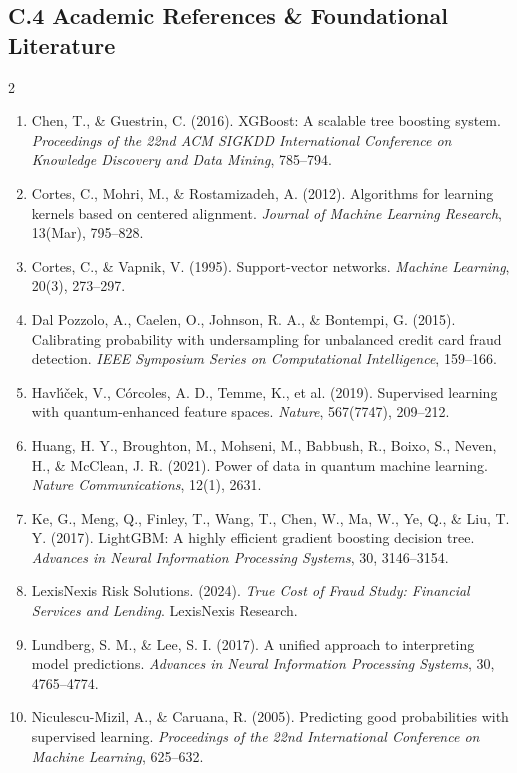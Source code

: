 \documentclass[10pt,a4paper]{article}
\begin{document}
\subsection*{C.4 Academic References \& Foundational Literature}
\begin{multicols}{2}
\begin{enumerate}[leftmargin=*,itemsep=0.2pt,topsep=0.5pt]
\tiny
\item Chen, T., \& Guestrin, C. (2016). XGBoost: A scalable tree boosting system. \textit{Proceedings of the 22nd ACM SIGKDD International Conference on Knowledge Discovery and Data Mining}, 785--794.
\item Cortes, C., Mohri, M., \& Rostamizadeh, A. (2012). Algorithms for learning kernels based on centered alignment. \textit{Journal of Machine Learning Research}, 13(Mar), 795--828.
\item Cortes, C., \& Vapnik, V. (1995). Support-vector networks. \textit{Machine Learning}, 20(3), 273--297.
\item Dal Pozzolo, A., Caelen, O., Johnson, R. A., \& Bontempi, G. (2015). Calibrating probability with undersampling for unbalanced credit card fraud detection. \textit{IEEE Symposium Series on Computational Intelligence}, 159--166.
\item Havl{\'\i}{\v{c}}ek, V., C{\'o}rcoles, A. D., Temme, K., et al. (2019). Supervised learning with quantum-enhanced feature spaces. \textit{Nature}, 567(7747), 209--212.
\item Huang, H. Y., Broughton, M., Mohseni, M., Babbush, R., Boixo, S., Neven, H., \& McClean, J. R. (2021). Power of data in quantum machine learning. \textit{Nature Communications}, 12(1), 2631.
\item Ke, G., Meng, Q., Finley, T., Wang, T., Chen, W., Ma, W., Ye, Q., \& Liu, T. Y. (2017). LightGBM: A highly efficient gradient boosting decision tree. \textit{Advances in Neural Information Processing Systems}, 30, 3146--3154.
\item LexisNexis Risk Solutions. (2024). \textit{True Cost of Fraud Study: Financial Services and Lending}. LexisNexis Research.
\item Lundberg, S. M., \& Lee, S. I. (2017). A unified approach to interpreting model predictions. \textit{Advances in Neural Information Processing Systems}, 30, 4765--4774.
\item Niculescu-Mizil, A., \& Caruana, R. (2005). Predicting good probabilities with supervised learning. \textit{Proceedings of the 22nd International Conference on Machine Learning}, 625--632.

\end{enumerate}
\end{multicols}
\end{document}
